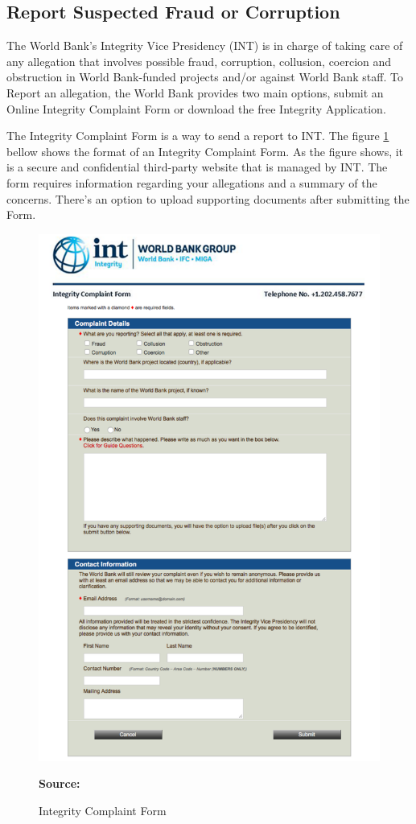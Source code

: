 \subsection{Report Suspected Fraud or Corruption}

The World Bank's Integrity Vice Presidency (INT) is in charge of taking care of any allegation that involves possible fraud, corruption, collusion, coercion and obstruction in World Bank-funded projects and/or against World Bank staff. To Report an allegation, the World Bank provides two main options, submit an Online Integrity Complaint Form or download the free Integrity Application. 

The Integrity Complaint Form is a way to send a report to INT. The figure \ref{fig_complaint} bellow shows the format of an Integrity Complaint Form. As the figure shows, it is a secure and confidential third-party website that is managed by INT. The form requires information regarding your allegations and a summary of the concerns. There's an option to upload supporting documents after submitting the Form.

\begin{figure}[H]
\caption{Integrity Complaint Form}
\label{fig_complaint}
\begin{center}
\includegraphics[max width=.75\textwidth]{../img/wb_report_complaint.pdf}
\end{center}
\noindent \footnotesize{\textbf{Source:} \cite{wb_complaint}}
\end{figure}


